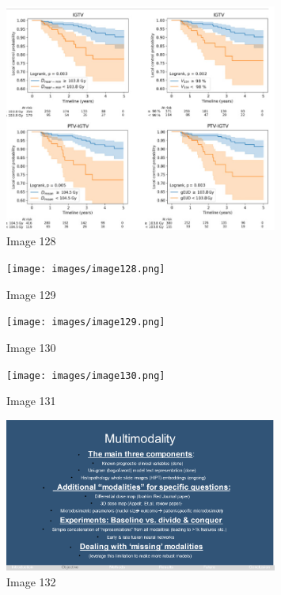 \documentclass{article}%
\begin{document}
%


\begin{figure}[h!]%
\centering%
\includegraphics[width=0.8\textwidth]{images/image127.png}%
\caption{Image 128}%
\end{figure}

%


\begin{figure}[h!]%
\centering%
\texttt{[image: images/image128.png]}%
\caption{Image 129}%
\end{figure}

%


\begin{figure}[h!]%
\centering%
\texttt{[image: images/image129.png]}%
\caption{Image 130}%
\end{figure}

%


\begin{figure}[h!]%
\centering%
\texttt{[image: images/image130.png]}%
\caption{Image 131}%
\end{figure}

%


\begin{figure}[h!]%
\centering%
\includegraphics[width=0.8\textwidth]{images/image131.png}%
\caption{Image 132}%
\end{figure}
\end{document}
